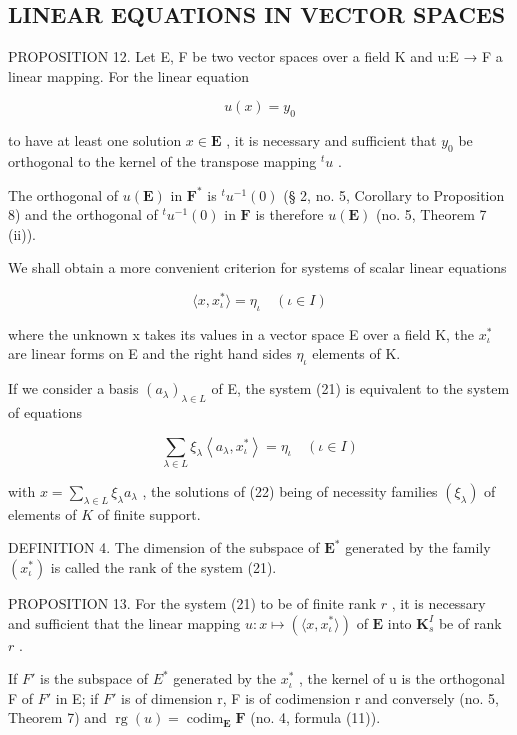 \subsection{LINEAR EQUATIONS IN VECTOR SPACES}

PROPOSITION 12. Let E, F be two vector spaces over a field K and u:E → F a linear mapping. For the linear equation

\[
u (x) = y _ {0}\tag{20}
\]

to have at least one solution \(x \in \mathbf{E}\) , it is necessary and sufficient that \(y_0\) be orthogonal to the kernel of the transpose mapping \(^t u\) .

The orthogonal of \(u(\mathbf{E})\) in \(\mathbf{F}^*\) is \({}^t u^{-1}(0)\) (§ 2, no. 5, Corollary to Proposition 8) and the orthogonal of \({}^t u^{-1}(0)\) in \(\mathbf{F}\) is therefore \(u(\mathbf{E})\) (no. 5, Theorem 7 (ii)).

We shall obtain a more convenient criterion for systems of scalar linear equations

\[
\langle x, x _ {\iota} ^ {*} \rangle = \eta_ {\iota} \quad (\iota \in I)\tag{21}
\]

where the unknown x takes its values in a vector space E over a field K, the \(x_{\iota}^{*}\) are linear forms on E and the right hand sides \(\eta_{\iota}\) elements of K.

If we consider a basis \((a_{\lambda})_{\lambda\in L}\) of E, the system (21) is equivalent to the system of equations

\[
\sum_ {\lambda \in L} \xi_ {\lambda} \left\langle a _ {\lambda}, x _ {\iota} ^ {*} \right\rangle = \eta_ {\iota} \quad (\iota \in I)\tag{22}
\]

with \(x = \sum_{\lambda \in L} \xi_{\lambda} a_{\lambda}\) , the solutions of (22) being of necessity families \((\xi_{\lambda})\) of elements of \(K\) of finite support.

DEFINITION 4. The dimension of the subspace of \(\mathbf{E}^*\) generated by the family \((x_{\iota}^{*})\) is called the rank of the system (21).

PROPOSITION 13. For the system (21) to be of finite rank \(r\) , it is necessary and sufficient that the linear mapping \(u: x \mapsto (\langle x, x_{\iota}^* \rangle)\) of \(\mathbf{E}\) into \(\mathbf{K}_s^I\) be of rank \(r\) .

If \(F'\) is the subspace of \(E^{*}\) generated by the \(x_{\iota}^{*}\) , the kernel of u is the orthogonal F of \(F'\) in E; if \(F'\) is of dimension r, F is of codimension r and conversely (no. 5, Theorem 7) and \(\operatorname{rg}(u) = \operatorname{codim}_{\mathbf{E}} \mathbf{F}\) (no. 4, formula (11)).

